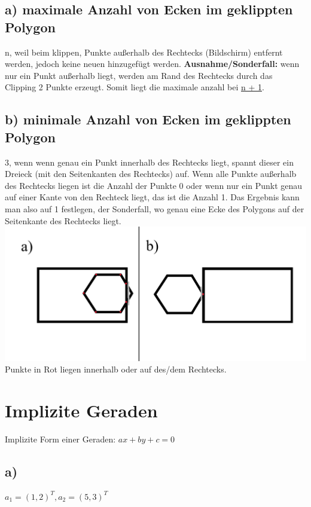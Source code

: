 \documentclass{article}
\begin{document}
\subsection*{a) maximale Anzahl von Ecken im geklippten Polygon}
n, weil beim klippen, Punkte außerhalb des Rechtecks (Bildschirm) entfernt werden, jedoch keine neuen hinzugefügt werden. \textbf{Ausnahme/Sonderfall:} wenn nur ein Punkt außerhalb liegt, werden am Rand des Rechtecks durch das Clipping 2 Punkte erzeugt. Somit liegt die maximale anzahl bei \underline{n + 1}.

\subsection*{b) minimale Anzahl von Ecken im geklippten Polygon}
3, wenn wenn genau ein Punkt innerhalb des Rechtecks liegt, spannt dieser ein Dreieck (mit den Seitenkanten des Rechtecks) auf. Wenn alle Punkte außerhalb des Rechtecks liegen ist die Anzahl der Punkte 0 oder wenn nur ein Punkt genau auf einer Kante von den Rechteck liegt, das ist die Anzahl 1.
Das Ergebnis kann man also auf 1 festlegen, der Sonderfall, wo genau eine Ecke des Polygons auf der Seitenkante des Rechtecks liegt.
\\
\includegraphics[width=400pt]{./files/Übung10.3.png}
\\
Punkte in Rot liegen innerhalb oder auf des/dem Rechtecks.

\section{Implizite Geraden}

Implizite Form einer Geraden: $ax + by +c = 0$

\subsection*{a)}
$a_1 = (1,2)^T, a_2 = (5,3)^T$
\end{document}
